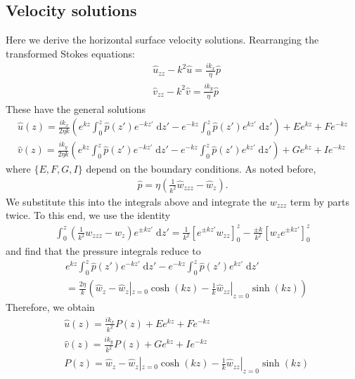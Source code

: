 \documentclass[paper=a4, fontsize=11pt]{article}
\begin{document}
\subsection*{Velocity solutions}
Here we derive the horizontal surface velocity solutions.
Rearranging the transformed Stokes equations:
\begin{align}
  &  \widehat{u}_{zz}-k^2\widehat{u} = \frac{ik_x}{\eta}\widehat{p} \\
  &  \widehat{v}_{zz}-k^2\widehat{v} = \frac{ik_y}{\eta}\widehat{p}
\end{align}
These have the general solutions
\begin{align}
\widehat{u}(z) = \frac{ik_x }{2\eta k} \left(e^{kz}\int_0^z \widehat{p}(z')e^{-kz'}\;\mathrm{d}z' -
e^{-kz}\int_0^z \widehat{p}(z')e^{kz'}\;\mathrm{d}z'\right)
+ E e^{kz} + F e^{-kz} \\
\widehat{v}(z) = \frac{ik_y }{2\eta k} \left(e^{kz}\int_0^z \widehat{p}(z')e^{-kz'}\;\mathrm{d}z' -
e^{-kz}\int_0^z \widehat{p}(z')e^{kz'}\;\mathrm{d}z'\right)
+ G e^{kz} + I e^{-kz}
\end{align}
where $\{E,F,G,I\}$ depend on the boundary conditions.
As noted before,
\begin{align}
\widehat{p} = \eta\left(\frac{1}{k^2}\widehat{w}_{zzz}-\widehat{w}_z \right).
\end{align}
We substitute this into the integrals above
and integrate the $w_{zzz}$ term by parts twice.
To this end, we use the identity
\begin{align}
\int_0^z \left( \frac{1}{k^2} w_{zzz} - w_{z}\right) e^{\pm kz'}\;\mathrm{d}z'
= \frac{1}{k^2} \left[e^{\pm kz'}w_{zz}\right]_0^z - \frac{\pm k}{k^2}\left[w_ze^{\pm kz'} \right]_0^z
\end{align}
and find that the pressure integrals reduce to
\begin{align}
&e^{kz}\int_0^z \widehat{p}(z')e^{-kz'}\;\mathrm{d}z' -
  e^{-kz}\int_0^z \widehat{p}(z')e^{kz'}\;\mathrm{d}z' \nonumber
  \\ &= \frac{2\eta}{k} \left( \widehat{w}_z-\widehat{w}_z|_{z=0}\cosh(kz) - \frac{1}{k} \widehat{w}_{zz}|_{z=0}\sinh(kz)  \right)
\end{align}
Therefore, we obtain
\begin{align}
&\widehat{u}(z) = \frac{ik_x }{k^2} P(z)
+ E e^{kz} + F e^{-kz} \\
&\widehat{v}(z) = \frac{ik_y }{k^2} P(z) + G e^{kz} + I e^{-kz} \\
&P(z) = \widehat{w}_z-\widehat{w}_z|_{z=0}\cosh(kz) - \frac{1}{k} \widehat{w}_{zz}|_{z=0}\sinh(kz)
\end{align}
\end{document}
